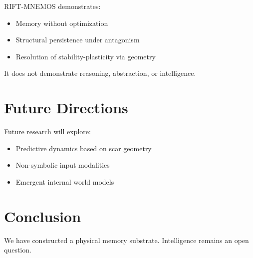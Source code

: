 \documentclass[11pt, a4paper]{article}
\begin{document}
RIFT-MNEMOS demonstrates:
\begin{itemize}
    \item Memory without optimization
    \item Structural persistence under antagonism
    \item Resolution of stability-plasticity via geometry
\end{itemize}

It does not demonstrate reasoning, abstraction, or intelligence.

\section{Future Directions}

Future research will explore:
\begin{itemize}
    \item Predictive dynamics based on scar geometry
    \item Non-symbolic input modalities
    \item Emergent internal world models
\end{itemize}

\section{Conclusion}

We have constructed a physical memory substrate.
Intelligence remains an open question.
\end{document}
